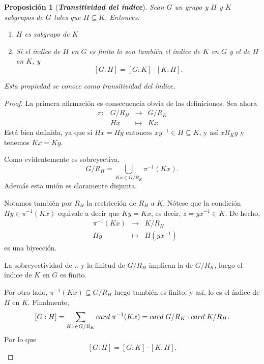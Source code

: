\documentclass[12pt]{article}
\newtheorem{proposition}[theorem]{Proposición}
\begin{document}
\begin{proposition}[\textbf{\textit{Transitividad del índice}}]\label{prop:tranIn} Sean $G$ un grupo y $H$ y $K$ subgrupos de $G$ tales que $H \subseteq K$. Entonces:
\begin{enumerate}
\item $H$ es subgrupo de $K$
\item Si el índice de $H$ en $G$ es finito lo son también el índice de $K$ en $G$ y el de $H$ en $K$, y $$\left[ G:H \right] = \left[ G:K \right]\cdot \left[ K:H \right].$$
\end{enumerate}
Esta propiedad se conoce como \textit{transitividad del índice.}
\end{proposition}
\begin{proof}
La primera afirmación es consecuencia obvia de las definiciones. Sea ahora $$
\begin{array}{rccl}
\pi \colon &G/R_H & \longrightarrow &G/R_K\\
&Hx & \longmapsto &Kx
\end{array}
$$
Está bien definida, ya que si $Hx = Hy$ entonces $xy^{-1} \in H \subseteq K$, y así $xR_Ky$ y tenemos $Kx = Ky$.

Como evidentemente es sobreyectiva, $$G/R_H = \bigcup_{Kx \in G/R_K}\pi^{-1}(Kx).$$ Además esta unión es claramente disjunta.

Notamos también por $R_H$ la restricción de $R_H$ a $K$. Nótese que la condición $Hy \in \pi^{-1}(Kx)$ equivale a decir que $Ky = Kx$, es decir, $z = yx^{-1} \in K$. De hecho, $$
\begin{array}{rccl}
&\pi^{-1}(Kx) & \longrightarrow &K/R_H\\
&Hy & \longmapsto &H(yx^{-1})
\end{array}
$$
es una biyección. 

La sobreyectividad de $\pi$ y la finitud de $G/R_H$ implican la de $G/R_K$, luego el índice de $K$ en $G$ es finito. 

Por otro lado, $\pi^{-1}(Kx) \subseteq G/R_H$ luego también es finito, y así, lo es el índice de $H$ en $K$. Finalmente, $$[G:H] = \sum_{Kx \in G/R_K} card \hspace{0.1cm}\pi^{-1}(Kx) = card\hspace{0.1cm} G/R_K \cdot card\hspace{0.1cm} K/R_H.$$ Por lo que $$[G:H] = [G:K] \cdot [K:H].$$

\end{proof}
\end{document}
